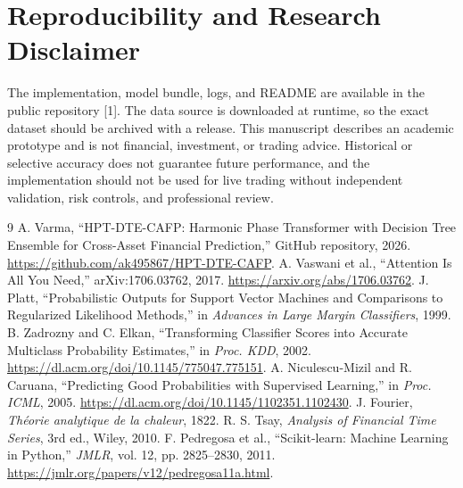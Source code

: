 \documentclass[11pt]{article}
\begin{document}
\section*{Reproducibility and Research Disclaimer}
The implementation, model bundle, logs, and README are available in the public repository [1]. The data source is downloaded at runtime, so the exact dataset should be archived with a release. This manuscript describes an academic prototype and is not financial, investment, or trading advice. Historical or selective accuracy does not guarantee future performance, and the implementation should not be used for live trading without independent validation, risk controls, and professional review.

\begin{thebibliography}{9}
 A. Varma, ``HPT-DTE-CAFP: Harmonic Phase Transformer with Decision Tree Ensemble for Cross-Asset Financial Prediction,'' GitHub repository, 2026. \url{https://github.com/ak495867/HPT-DTE-CAFP}.
 A. Vaswani et al., ``Attention Is All You Need,'' arXiv:1706.03762, 2017. \url{https://arxiv.org/abs/1706.03762}.
 J. Platt, ``Probabilistic Outputs for Support Vector Machines and Comparisons to Regularized Likelihood Methods,'' in \emph{Advances in Large Margin Classifiers}, 1999.
 B. Zadrozny and C. Elkan, ``Transforming Classifier Scores into Accurate Multiclass Probability Estimates,'' in \emph{Proc. KDD}, 2002. \url{https://dl.acm.org/doi/10.1145/775047.775151}.
 A. Niculescu-Mizil and R. Caruana, ``Predicting Good Probabilities with Supervised Learning,'' in \emph{Proc. ICML}, 2005. \url{https://dl.acm.org/doi/10.1145/1102351.1102430}.
 J. Fourier, \emph{Th\'eorie analytique de la chaleur}, 1822.
 R. S. Tsay, \emph{Analysis of Financial Time Series}, 3rd ed., Wiley, 2010.
 F. Pedregosa et al., ``Scikit-learn: Machine Learning in Python,'' \emph{JMLR}, vol. 12, pp. 2825--2830, 2011. \url{https://jmlr.org/papers/v12/pedregosa11a.html}.
\end{thebibliography}
\end{document}
